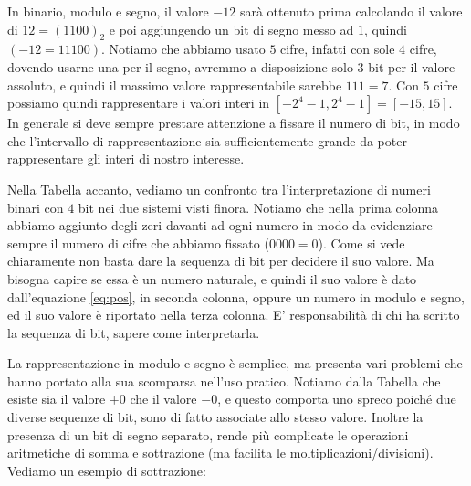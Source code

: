 \begin{ex} In binario, modulo e segno, il valore $-12$ sarà ottenuto prima
calcolando il valore di $12 = (1100)_2$ e poi aggiungendo un bit di segno messo
ad $1$, quindi $(-12 = 11100)$. Notiamo che abbiamo usato $5$ cifre, infatti
con sole $4$ cifre, dovendo usarne una per il segno, avremmo a disposizione
solo $3$ bit per il valore assoluto, e quindi il massimo valore rappresentabile
sarebbe $111 = 7$. Con $5$ cifre possiamo quindi rappresentare i valori interi
in $[-2^4-1,2^4-1] = [-15,15]$. In generale si deve sempre prestare attenzione a fissare il numero di bit, in modo che l'intervallo di rappresentazione sia sufficientemente grande da poter rappresentare gli interi di nostro interesse. \end{ex}

Nella Tabella accanto, vediamo un confronto tra l'interpretazione di numeri binari con $4$ bit nei due sistemi visti finora. Notiamo che nella prima colonna
abbiamo aggiunto degli zeri davanti ad ogni numero in modo da evidenziare sempre
il numero di cifre che abbiamo fissato ($0000 = 0$). Come si vede chiaramente non basta dare la sequenza di bit per decidere il suo valore. Ma bisogna capire se essa è un numero naturale, e quindi il suo valore è dato dall'equazione \eqref{eq:pos}, in seconda colonna, oppure un numero in modulo e segno, ed il suo valore è riportato nella terza colonna. E' responsabilità di chi ha scritto la sequenza di bit, sapere come interpretarla.

La rappresentazione in modulo e segno è semplice, ma presenta vari problemi che hanno portato alla sua scomparsa nell'uso pratico. Notiamo dalla Tabella che esiste sia il valore $+0$ che il valore $-0$, e questo comporta uno spreco poiché due diverse sequenze di bit, sono di fatto associate allo stesso valore. Inoltre la presenza di un bit di segno separato, rende più complicate le operazioni aritmetiche di somma e sottrazione (ma facilita le moltiplicazioni/divisioni). Vediamo un esempio di sottrazione:

